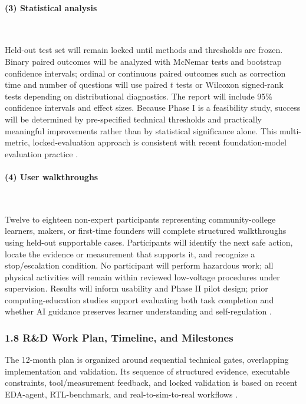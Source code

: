 \documentclass[11pt,letterpaper]{article}
\begin{document}
\paragraph{(3) Statistical analysis}~{}

Held-out test set will remain locked until methods and thresholds are frozen. Binary paired outcomes will be analyzed with McNemar tests and bootstrap confidence intervals; ordinal or continuous paired outcomes such as correction time and number of questions will use paired $t$ tests or Wilcoxon signed-rank tests depending on distributional diagnostics. The report will include 95\% confidence intervals and effect sizes.%
Because Phase I is a feasibility study, success will be determined by pre-specified technical thresholds and practically meaningful improvements rather than by statistical significance alone. This multi-metric, locked-evaluation approach is consistent with recent foundation-model evaluation practice \cite{liang2023helm}.

\paragraph{(4) User walkthroughs}~{}

Twelve to eighteen non-expert participants representing community-college learners, makers, or first-time founders will complete structured walkthroughs using held-out supportable cases. %
Participants will identify the next safe action, locate the evidence or measurement that supports it, and recognize a stop/escalation condition. No participant will perform hazardous work; all physical activities will remain within reviewed low-voltage procedures under supervision. Results will inform usability and Phase II pilot design; prior computing-education studies support evaluating both task completion and whether AI guidance preserves learner understanding and self-regulation \cite{liffiton2023codehelp,kazemitabaar2023aicode,crompton2023highered}.


\subsubsection*{1.8 R\&D Work Plan, Timeline, and Milestones}
The 12-month plan is organized around sequential technical gates, overlapping implementation and validation. Its sequence of structured evidence, executable constraints, tool/measurement feedback, and locked validation is based on recent EDA-agent, RTL-benchmark, and real-to-sim-to-real workflows \cite{he2024chateda,lu2024rtllm,torne2024realtosim}. 
\end{document}
